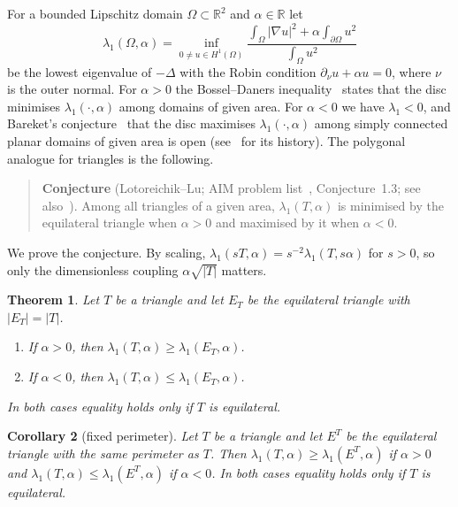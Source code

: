 \documentclass[11pt]{article}
\newtheorem{theorem}{Theorem}[section]
\newtheorem{corollary}[theorem]{Corollary}
\theoremstyle{remark}
\newcommand{\R}{\mathbb{R}}
\newcommand{\E}{E}
\begin{document}
For a bounded Lipschitz domain $\Omega\subset\R^2$ and $\alpha\in\R$ let
\begin{equation}\label{eq:var}
  \lambda_1(\Omega,\alpha)=\inf_{0\neq u\in H^1(\Omega)}
  \frac{\int_\Omega|\nabla u|^2+\alpha\int_{\partial\Omega}u^2}{\int_\Omega u^2}
\end{equation}
be the lowest eigenvalue of $-\Delta$ with the Robin condition $\partial_\nu u+\alpha u=0$, where $\nu$
is the outer normal. For $\alpha>0$ the Bossel--Daners inequality~\cite{Bossel,Daners} states that the
disc minimises $\lambda_1(\cdot,\alpha)$ among domains of given area. For $\alpha<0$ we have
$\lambda_1<0$, and Bareket's conjecture~\cite{Bareket} that the disc maximises $\lambda_1(\cdot,\alpha)$
among simply connected planar domains of given area is open (see~\cite{AFK,KLV} for its history). The
polygonal analogue for triangles is the following.

\begin{quote}
\textbf{Conjecture} (Lotoreichik--Lu; AIM problem list~\cite{AimPL}, Conjecture~1.3; see
also~\cite{LaSi,KLV}). Among all triangles of a given area, $\lambda_1(T,\alpha)$ is minimised by the
equilateral triangle when $\alpha>0$ and maximised by it when $\alpha<0$.
\end{quote}

We prove the conjecture. By scaling, $\lambda_1(sT,\alpha)=s^{-2}\lambda_1(T,s\alpha)$ for $s>0$, so
only the dimensionless coupling $\alpha\sqrt{|T|}$ matters.

\begin{theorem}\label{thm:main}
Let $T$ be a triangle and let $\E_T$ be the equilateral triangle with $|\E_T|=|T|$.
\begin{enumerate}
\item[\textup{(1)}] If $\alpha>0$, then $\lambda_1(T,\alpha)\ge\lambda_1(\E_T,\alpha)$.
\item[\textup{(2)}] If $\alpha<0$, then $\lambda_1(T,\alpha)\le\lambda_1(\E_T,\alpha)$.
\end{enumerate}
In both cases equality holds only if $T$ is equilateral.
\end{theorem}

\begin{corollary}[fixed perimeter]\label{cor:perimeter}
Let $T$ be a triangle and let $\E^T$ be the equilateral triangle with the same perimeter as $T$. Then
$\lambda_1(T,\alpha)\ge\lambda_1(\E^T,\alpha)$ if $\alpha>0$ and $\lambda_1(T,\alpha)\le\lambda_1(\E^T,\alpha)$ if
$\alpha<0$. In both cases equality holds only if $T$ is equilateral.
\end{corollary}
\end{document}
